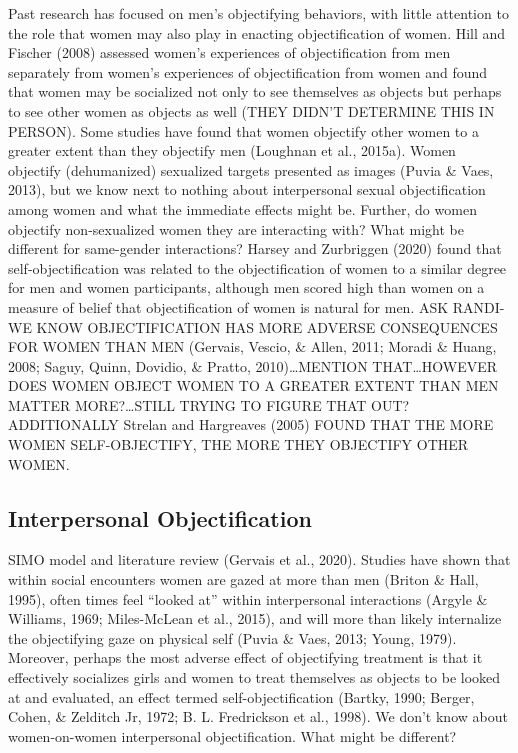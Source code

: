 \documentclass[
  man]{apa6}
\begin{document}
Past research has focused on men's objectifying behaviors, with little
attention to the role that women may also play in enacting
objectification of women. Hill and Fischer (2008) assessed women's
experiences of objectification from men separately from women's
experiences of objectification from women and found that women may be
socialized not only to see themselves as objects but perhaps to see
other women as objects as well (THEY DIDN'T DETERMINE THIS IN PERSON).
Some studies have found that women objectify other women to a greater
extent than they objectify men (Loughnan et al., 2015a). Women objectify
(dehumanized) sexualized targets presented as images (Puvia \& Vaes,
2013), but we know next to nothing about interpersonal sexual
objectification among women and what the immediate effects might be.
Further, do women objectify non-sexualized women they are interacting
with? What might be different for same-gender interactions? Harsey and
Zurbriggen (2020) found that self-objectification was related to the
objectification of women to a similar degree for men and women
participants, although men scored high than women on a measure of belief
that objectification of women is natural for men. ASK RANDI-WE KNOW
OBJECTIFICATION HAS MORE ADVERSE CONSEQUENCES FOR WOMEN THAN MEN
(Gervais, Vescio, \& Allen, 2011; Moradi \& Huang, 2008; Saguy, Quinn,
Dovidio, \& Pratto, 2010)\ldots{}MENTION THAT\ldots{}HOWEVER DOES WOMEN
OBJECT WOMEN TO A GREATER EXTENT THAN MEN MATTER MORE?\ldots{}STILL
TRYING TO FIGURE THAT OUT? ADDITIONALLY Strelan and Hargreaves (2005)
FOUND THAT THE MORE WOMEN SELF-OBJECTIFY, THE MORE THEY OBJECTIFY OTHER
WOMEN.

\subsection{Interpersonal
Objectification}\label{interpersonal-objectification}

SIMO model and literature review (Gervais et al., 2020). Studies have
shown that within social encounters women are gazed at more than men
(Briton \& Hall, 1995), often times feel \enquote{looked at} within
interpersonal interactions (Argyle \& Williams, 1969; Miles-McLean et
al., 2015), and will more than likely internalize the objectifying gaze
on physical self (Puvia \& Vaes, 2013; Young, 1979). Moreover, perhaps
the most adverse effect of objectifying treatment is that it effectively
socializes girls and women to treat themselves as objects to be looked
at and evaluated, an effect termed self-objectification (Bartky, 1990;
Berger, Cohen, \& Zelditch Jr, 1972; B. L. Fredrickson et al., 1998). We
don't know about women-on-women interpersonal objectification. What
might be different?
\end{document}
